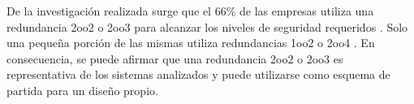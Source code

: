 	De la investigación realizada surge que el 66\% de las empresas utiliza una redundancia 2oo2 o 2oo3 para alcanzar los niveles de seguridad requeridos \cite{SIEMENS,ALSTOM,HITACHI,THALES,BOMBARDIER,KYOSAN,HIMA,CRRC,CAF,TRANSMASHHOLDING,HYUNDAI,GENERAL,CATERPILLAR,STADLER}. Solo una pequeña porción de las mismas utiliza redundancias 1oo2 \cite{ALSTOM} o 2oo4 \cite{HITACHI}. En consecuencia, se puede afirmar que una redundancia 2oo2 o 2oo3 es representativa de los sistemas analizados y puede utilizarse como esquema de partida para un diseño propio.